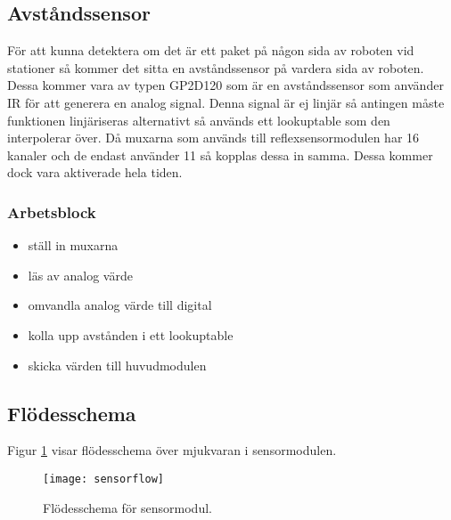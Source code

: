 \subsection{Avståndssensor}
För att kunna detektera om det är ett paket på någon sida av roboten vid stationer så kommer det sitta en avståndssensor på vardera sida av roboten. Dessa kommer vara av typen GP2D120 som är en avståndssensor som använder IR för att generera en analog signal. Denna signal är ej linjär så antingen måste funktionen linjäriseras alternativt så används ett lookuptable som den interpolerar över. Då muxarna som används till reflexsensormodulen har 16 kanaler och de endast använder 11 så kopplas dessa in samma. Dessa kommer dock vara aktiverade hela tiden.
\subsubsection{Arbetsblock}
\begin{itemize}
\item ställ in muxarna
\item läs av analog värde
\item omvandla analog värde till digital
\item kolla upp avstånden i ett lookuptable
\item skicka värden till huvudmodulen
\end{itemize}

\newpage
\subsection{Flödesschema}
Figur \ref{systemskiss:sensorschema} visar flödesschema över mjukvaran i sensormodulen.


\begin{figure}[h]
\center
\texttt{[image: sensorflow]}
\caption{Flödesschema för sensormodul.} \label{systemskiss:sensorschema}
\end{figure}

%